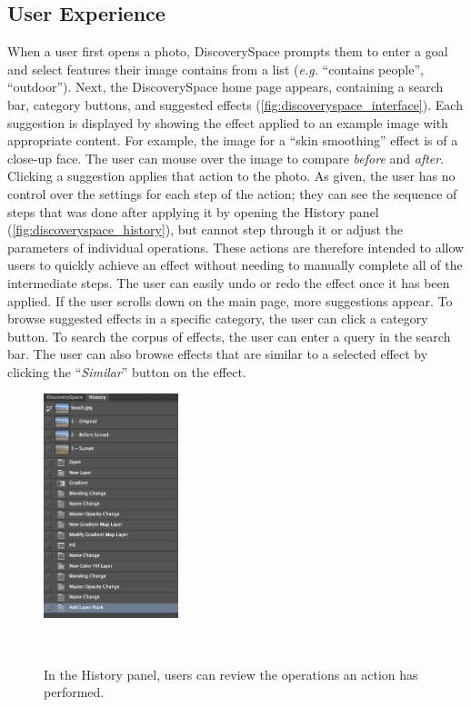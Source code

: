 \subsection{User Experience}
When a user first opens a photo, Discovery\-Space prompts them to enter a goal and select features their image contains from a list (\textit{e.g.} ``contains people'', ``outdoor''). Next, the Discovery\-Space home page appears, containing a search bar, category buttons, and suggested effects (\autoref{fig:discoveryspace_interface}). Each suggestion is displayed by showing the effect applied to an example image with appropriate content. For example, the image for a ``skin smoothing'' effect is of a close-up face. The user can mouse over the image to compare \textit{before} and \textit{after}. Clicking a suggestion applies that action to the photo. As given, the user has no control over the settings for each step of the action; they can see the sequence of steps that was done after applying it by opening the History panel (\autoref{fig:discoveryspace_history}), but cannot step through it or adjust the parameters of individual operations. These actions are therefore intended to allow users to quickly achieve an effect without needing to manually complete all of the intermediate steps. The user can easily undo or redo the effect once it has been applied. If the user scrolls down on the main page, more suggestions appear. To browse suggested effects in a specific category, the user can click a category button. To search the corpus of effects, the user can enter a query in the search bar. The user can also browse effects that are similar to a selected effect by clicking the ``\textit{Similar}'' button on the effect. 

\begin{figure}[b!]
\centering
  \includegraphics[width=0.35\textwidth]{discoveryspace/figures/history.png}
  \caption{In the History panel, users can review the operations an action has performed.}~\label{fig:discoveryspace_history}
\end{figure}

